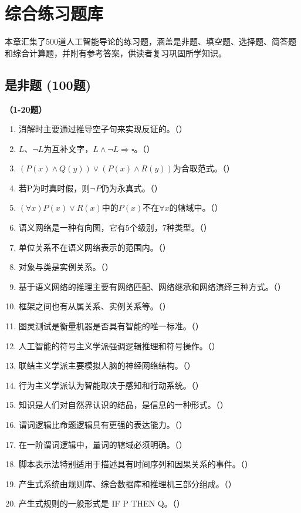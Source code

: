 \chapter{综合练习题库}

本章汇集了500道人工智能导论的练习题，涵盖是非题、填空题、选择题、简答题和综合计算题，并附有参考答案，供读者复习巩固所学知识。

\section{是非题 (100题)}

\textbf{（1-20题）}
\begin{enumerate}[leftmargin=2em,itemsep=1pt]
\item 消解时主要通过推导空子句来实现反证的。（\quad）
\item $L$、$\neg L$为互补文字，$L \land \neg L \Rightarrow \square$。（\quad）
\item $(P(x) \land Q(y)) \lor (P(x) \land R(y))$为合取范式。（\quad）
\item 若P为时真时假，则$\neg P$仍为永真式。（\quad）
\item $(\forall x)P(x) \lor R(x)$中的$P(x)$不在$\forall x$的辖域中。（\quad）
\item 语义网络是一种有向图，它有5个级别，7种类型。（\quad）
\item 单位关系不在语义网络表示的范围内。（\quad）
\item 对象与类是实例关系。（\quad）
\item 基于语义网络的推理主要有网络匹配、网络继承和网络演绎三种方式。（\quad）
\item 框架之间也有从属关系、实例关系等。（\quad）
\item 图灵测试是衡量机器是否具有智能的唯一标准。（\quad）
\item 人工智能的符号主义学派强调逻辑推理和符号操作。（\quad）
\item 联结主义学派主要模拟人脑的神经网络结构。（\quad）
\item 行为主义学派认为智能取决于感知和行动系统。（\quad）
\item 知识是人们对自然界认识的结晶，是信息的一种形式。（\quad）
\item 谓词逻辑比命题逻辑具有更强的表达能力。（\quad）
\item 在一阶谓词逻辑中，量词的辖域必须明确。（\quad）
\item 脚本表示法特别适用于描述具有时间序列和因果关系的事件。（\quad）
\item 产生式系统由规则库、综合数据库和推理机三部分组成。（\quad）
\item 产生式规则的一般形式是 IF P THEN Q。（\quad）
\end{enumerate}

